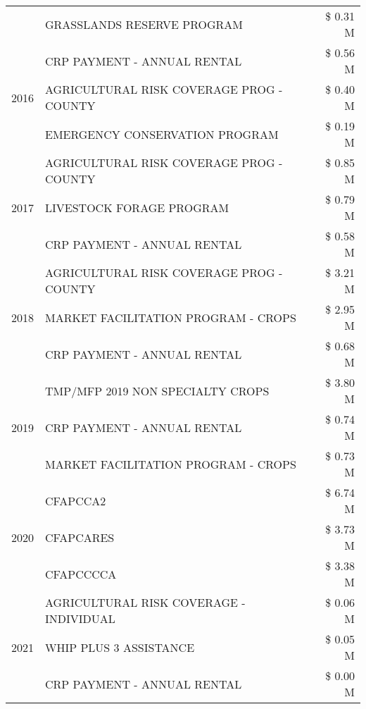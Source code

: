 \begin{tabular}{llr}
 & GRASSLANDS RESERVE PROGRAM & \$ 0.31 M \\
\cline{1-3}
\multirow[t]{3}{*}{2016} & CRP PAYMENT - ANNUAL RENTAL & \$ 0.56 M \\
 & AGRICULTURAL RISK COVERAGE PROG - COUNTY & \$ 0.40 M \\
 & EMERGENCY CONSERVATION PROGRAM & \$ 0.19 M \\
\cline{1-3}
\multirow[t]{3}{*}{2017} & AGRICULTURAL RISK COVERAGE PROG - COUNTY & \$ 0.85 M \\
 & LIVESTOCK FORAGE PROGRAM & \$ 0.79 M \\
 & CRP PAYMENT - ANNUAL RENTAL & \$ 0.58 M \\
\cline{1-3}
\multirow[t]{3}{*}{2018} & AGRICULTURAL RISK COVERAGE PROG - COUNTY & \$ 3.21 M \\
 & MARKET FACILITATION PROGRAM - CROPS & \$ 2.95 M \\
 & CRP PAYMENT - ANNUAL RENTAL & \$ 0.68 M \\
\cline{1-3}
\multirow[t]{3}{*}{2019} & TMP/MFP 2019 NON SPECIALTY CROPS & \$ 3.80 M \\
 & CRP PAYMENT - ANNUAL RENTAL & \$ 0.74 M \\
 & MARKET FACILITATION PROGRAM - CROPS & \$ 0.73 M \\
\cline{1-3}
\multirow[t]{3}{*}{2020} & CFAPCCA2 & \$ 6.74 M \\
 & CFAPCARES & \$ 3.73 M \\
 & CFAPCCCCA & \$ 3.38 M \\
\cline{1-3}
\multirow[t]{3}{*}{2021} & AGRICULTURAL RISK COVERAGE - INDIVIDUAL & \$ 0.06 M \\
 & WHIP PLUS 3 ASSISTANCE & \$ 0.05 M \\
 & CRP PAYMENT - ANNUAL RENTAL & \$ 0.00 M \\
\cline{1-3}
\bottomrule
\end{tabular}
